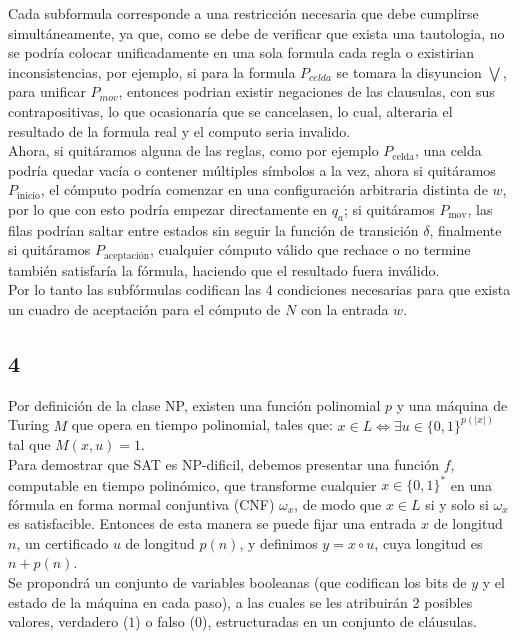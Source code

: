    Cada subformula corresponde a una restricción necesaria que debe cumplirse simultáneamente, ya que, como se debe de verificar que exista una tautologia, no se podría colocar unificadamente en una sola formula cada regla o existirian inconsistencias, por ejemplo, si para la formula $P_{celda}$ se tomara la disyuncion $\bigvee$, para unificar $P_{mov}$, entonces podrian existir negaciones de las clausulas, con sus contrapositivas, lo que ocasionaría que se cancelasen, lo cual, alteraria el resultado de la formula real y el computo seria invalido.\\
    
    Ahora, si quitáramos alguna de las reglas, como por ejemplo $P_{\text{celda}}$, una celda podría quedar vacía o contener múltiples símbolos a la vez, ahora si quitáramos $P_{\text{inicio}}$, el cómputo podría comenzar en una configuración arbitraria distinta de $w$, por lo que con esto podría empezar directamente en $q_a$; si quitáramos $P_{\text{mov}}$, las filas podrían saltar  entre estados sin seguir la función de transición $\delta$, finalmente si quitáramos $P_{\text{aceptación}}$, cualquier cómputo válido que rechace o no termine también satisfaría la fórmula, haciendo que el resultado fuera inválido.\\

    Por lo tanto las subfórmulas codifican las 4 condiciones necesarias para que exista un cuadro de aceptación para el cómputo de $N$ con la entrada $w$.

\subsection{4}
    Por definición de la clase NP, existen una función polinomial $p$ y una máquina de Turing $M$ que opera en tiempo polinomial, tales que:
$x \in L \iff \exists u \in \{0, 1\}^{p(|x|)}$ tal que $M(x, u) = 1$.\\

Para demostrar que SAT es NP-dificil, debemos presentar una función $f$, computable en tiempo polinómico, que transforme cualquier $x \in \{0, 1\}^*$ en una fórmula en forma normal conjuntiva (CNF) $\omega_x$, de modo que $x \in L$ si y solo si $\omega_x$ es satisfacible. Entonces de esta manera se puede fijar una entrada $x$ de longitud $n$, un certificado $u$ de longitud $p(n)$, y definimos $y = x \circ u$, cuya longitud es $n + p(n)$.\\

Se propondrá un conjunto de variables booleanas (que codifican los bits de $y$ y el estado de la máquina en cada paso), a las cuales se les atribuirán 2 posibles valores, verdadero ($1$) o falso ($0$), estructuradas en un conjunto de cláusulas.\\

